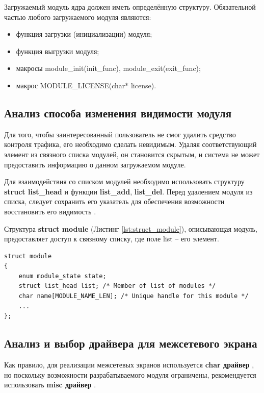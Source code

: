 Загружаемый модуль ядра должен иметь определённую структуру. Обязательной частью любого загружаемого модуля являются:
\begin{itemize}
	\item функция загрузки (инициализации) модуля;
	
	\item функция выгрузки модуля; 
	
	\item макросы module\_init(init\_func), module\_exit(exit\_func);
	
	\item макрос MODULE\_LICENSE(char* license). \newline
\end{itemize}

\subsection{Анализ способа изменения видимости модуля}
Для того, чтобы заинтересованный пользователь не смог удалить средство контроля трафика, его необходимо сделать невидимым. Удаляя соответствующий элемент из связного списка модулей, он становится скрытым, и система не может предоставить информацию о данном загружаемом модуле.

Для взаимодействия со списком модулей необходимо использовать структуру \textbf{struct list\_head} и функции \textbf{list\_add}, \textbf{list\_del}. Перед удалением модуля из списка, следует сохранить его указатель для обеспечения возможности восстановить его видимость \cite{hide}.

Структура \textbf{struct module} (Листинг \ref{lst:struct_module}), описывающая модуль, предоставляет доступ к связному списку, где поле list -- его элемент.
\begin{lstlisting}[caption = {struct module}, label=lst:struct_module]
struct module
{
	enum module_state state;
	struct list_head list; /* Member of list of modules */
	char name[MODULE_NAME_LEN]; /* Unique handle for this module */
	...
};
\end{lstlisting}

\subsection{Анализ и выбор драйвера для межсетевого экрана}
Как правило, для реализации межсетевых экранов используется \textbf{char драйвер} \cite{2nd}, но поскольку возможности разрабатываемого модуля ограничены, рекомендуется использовать \textbf{misc драйвер} \cite{2nd,misc}.

